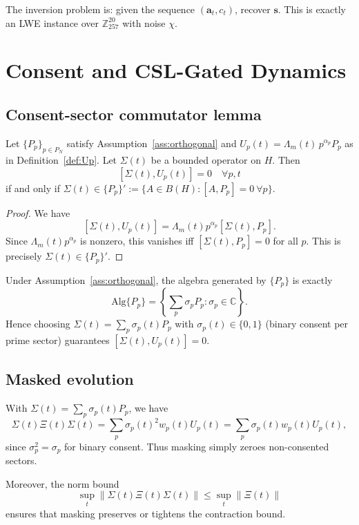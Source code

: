 \documentclass[11pt]{article}
\begin{document}
The inversion problem is: given the sequence $(\mathbf{a}_t, c_t)$, recover
$\mathbf{s}$. This is exactly an LWE instance over $\mathbb{Z}_{257}^{20}$ with
noise $\chi$.\cite{pqc-lwe}

\section{Consent and CSL-Gated Dynamics}

\subsection{Consent-sector commutator lemma}

\begin{lemma}\label{lem:comm}
Let $\{P_p\}_{p\in P_N}$ satisfy Assumption~\ref{ass:orthogonal} and
$U_p(t) = \Lambda_m(t)\, p^{\alpha_p} P_p$ as in Definition~\ref{def:Up}.
Let $\Sigma(t)$ be a bounded operator on $H$. Then
\[
[\Sigma(t), U_p(t)] = 0 \quad \forall p,t
\]
if and only if $\Sigma(t) \in \{P_p\}' := \{A \in B(H): [A, P_p]=0\ \forall p\}$.
\end{lemma}

\begin{proof}
We have
\[
[\Sigma(t), U_p(t)] = \Lambda_m(t) p^{\alpha_p} [\Sigma(t), P_p].
\]
Since $\Lambda_m(t)p^{\alpha_p}$ is nonzero, this vanishes iff
$[\Sigma(t), P_p]=0$ for all $p$. This is precisely $\Sigma(t) \in \{P_p\}'$.
\end{proof}

Under Assumption~\ref{ass:orthogonal}, the algebra generated by $\{P_p\}$ is
exactly
\[
\mathrm{Alg}\{P_p\} = \left\{ \sum_p \sigma_p P_p: \sigma_p \in \mathbb{C} \right\}.
\]
Hence choosing $\Sigma(t) = \sum_p \sigma_p(t) P_p$ with $\sigma_p(t)\in\{0,1\}$
(binary consent per prime sector) guarantees $[\Sigma(t), U_p(t)] = 0$.

\subsection{Masked evolution}

With $\Sigma(t) = \sum_p \sigma_p(t) P_p$, we have
\[
\Sigma(t) \Xi(t) \Sigma(t) = \sum_p \sigma_p(t)^2 w_p(t) U_p(t)
= \sum_p \sigma_p(t) w_p(t) U_p(t),
\]
since $\sigma_p^2 = \sigma_p$ for binary consent. Thus masking simply zeroes
non-consented sectors.

Moreover, the norm bound
\[
\sup_t \|\Sigma(t) \Xi(t) \Sigma(t)\|
\le \sup_t \|\Xi(t)\|
\]
ensures that masking preserves or tightens the contraction bound.
\end{document}
